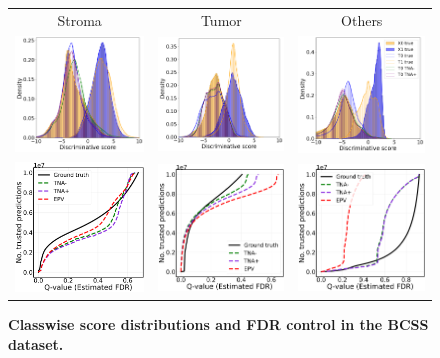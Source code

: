 \documentclass{article}
\begin{document}
\begin{figure}[h!]
	\centering	
	\begin{tabular}{ccc}
		Stroma & Tumor & Others \\
		\includegraphics[width=0.225\linewidth, height=0.225\linewidth]{experiments/bcss_0_neg_score_dist.png} &
		\includegraphics[width=0.225\linewidth, height=0.225\linewidth]{experiments/bcss_1_neg_score_dist.png} & 
		\includegraphics[width=0.225\linewidth, height=0.225\linewidth]{experiments/bcss_2_neg_score_dist.png} \\
		\includegraphics[width=0.225\linewidth, height=0.225\linewidth]{img/cnn_0th_bcss_class_fdr_control.png} &
		\includegraphics[width=0.225\linewidth, height=0.225\linewidth]{img/cnn_1st_bcss_class_fdr_control.png} & 
		\includegraphics[width=0.225\linewidth, height=0.225\linewidth]{img/cnn_2nd_bcss_class_fdr_control.png} \\
	\end{tabular}
	\caption{{\bf Classwise score distributions and FDR control in the BCSS dataset.}}
	\label{fig:BCSS-classwise}
\end{figure} 
\end{document}
